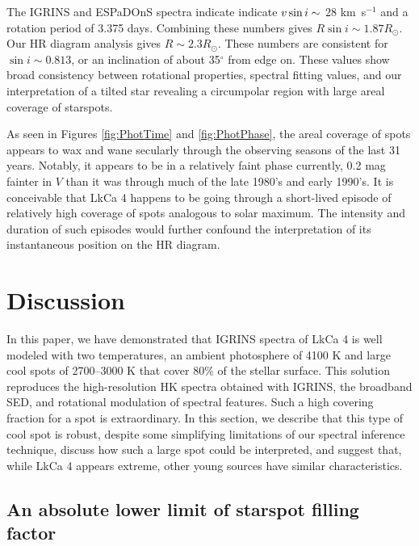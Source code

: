 \documentclass[twocolumn]{emulateapj}%
\begin{document}
The IGRINS and ESPaDOnS spectra indicate indicate $v \sin i\sim$ 28 km~s$^{-1}$ and a rotation period of 3.375 days. Combining these numbers gives $R\sin{i} \sim 1.87 R_{\odot}$. Our HR diagram analysis gives $R \sim 2.3R_{\odot}$. These numbers are consistent for $\sin{i} \sim 0.813$, or an inclination of about 35$^{\circ}$ from edge on. These values show broad consistency between rotational properties, spectral fitting values, and our interpretation of a tilted star revealing a circumpolar region with large areal coverage of starspots.

As seen in Figures \ref{fig:PhotTime} and \ref{fig:PhotPhase}, the areal coverage of spots appears to wax and wane secularly through the observing seasons of the last 31 years.  Notably, it appears to be in a relatively faint phase currently, 0.2 mag fainter in $V$ than it was through much of the late 1980's and early 1990's.  It is conceivable that LkCa 4 happens to be going through a short-lived episode of relatively high coverage of spots analogous to solar maximum.  The intensity and duration of such episodes would further confound the interpretation of its instantaneous position on the HR diagram.




\section{Discussion}


In this paper, we have demonstrated that IGRINS spectra of LkCa 4 is well modeled with two temperatures, an ambient photosphere of 4100 K and large cool spots of 2700--3000 K that cover 80\% of the stellar surface.  This solution reproduces the high-resolution HK spectra obtained with IGRINS, the broadband SED, and rotational modulation of spectral features.  Such a high covering fraction for a spot is extraordinary.  In this section, we describe that this type of cool spot is robust, despite some simplifying limitations of our spectral inference technique, discuss how such a large spot could be interpreted, and suggest that, while LkCa 4 appears extreme, other young sources have similar characteristics.


\subsection{An absolute lower limit of starspot filling factor}
\end{document}
